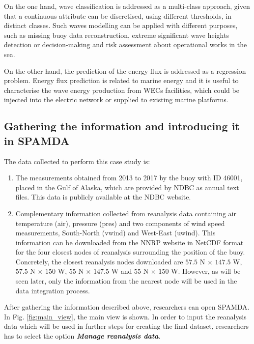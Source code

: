\documentclass[energies,article,submit,moreauthors,pdftex]{Definitions/mdpi}
\begin{document}
		On the one hand, wave classification is addressed as a multi-class approach, given that a continuous attribute can be discretised, using different thresholds, in distinct classes. Such waves modelling can be applied with different purposes, such as missing buoy data reconstruction, extreme significant wave heights detection or decision-making and risk assessment about operational works in the sea.

		On the other hand, the prediction of the energy flux is addressed as a regression problem. Energy flux prediction is related to marine energy and it is useful to characterise the wave energy production from WECs facilities, which could be injected into the electric network or supplied to existing marine platforms.

		\subsection{Gathering the information and introducing it in SPAMDA}\label{sec:ObtainingFinalDataset}
		
			The data collected to perform this case study is:
			\begin{enumerate}
			\item The measurements obtained from 2013 to 2017 by the buoy with ID 46001, placed in the Gulf of Alaska, which are provided by NDBC as annual text files. This data is publicly available at the NDBC website. 
			\item Complementary information collected from reanalysis data containing air temperature (air), pressure (pres) and two components of wind speed measurements, South-North (vwind) and West-East (uwind). This information can be downloaded from the NNRP website in NetCDF format for the four closest nodes of reanalysis surrounding the position of the buoy. Concretely, the closest reanalysis nodes downloaded are $57.5$ N $\times$ $147.5$ W, $57.5$ N $\times$ $150$ W, $55$ N $\times$ $147.5$ W and $55$ N $\times$ $150$ W. However, as will be seen later, only the information from the nearest node will be used in the data integration process.
			\end{enumerate}
		
			After gathering the information described above, researchers can open SPAMDA. In Fig. \ref{fig:main_view}, the main view is shown. In order to input the reanalysis data which will be used in further steps for creating the final dataset, researchers has to select the option \textbf{\textit{Manage reanalysis data}}.
\end{document}
